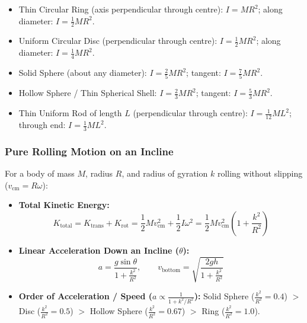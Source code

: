 \documentclass[11pt,a4paper]{article}
\begin{document}
\begin{formulabox}
\begin{itemize}[leftmargin=1.2em, itemsep=2pt]
  \item Thin Circular Ring (axis perpendicular through centre): $I = MR^2$; along diameter: $I = \frac{1}{2}MR^2$.
  \item Uniform Circular Disc (perpendicular through centre): $I = \frac{1}{2}MR^2$; along diameter: $I = \frac{1}{4}MR^2$.
  \item Solid Sphere (about any diameter): $I = \frac{2}{5}MR^2$; tangent: $I = \frac{7}{5}MR^2$.
  \item Hollow Sphere / Thin Spherical Shell: $I = \frac{2}{3}MR^2$; tangent: $I = \frac{5}{3}MR^2$.
  \item Thin Uniform Rod of length $L$ (perpendicular through centre): $I = \frac{1}{12}ML^2$; through end: $I = \frac{1}{3}ML^2$.
\end{itemize}
\end{formulabox}

\subsubsection{Pure Rolling Motion on an Incline}
For a body of mass $M$, radius $R$, and radius of gyration $k$ rolling without slipping ($v_{\text{cm}} = R\omega$):
\begin{itemize}[leftmargin=1.5em, itemsep=2pt]
  \item \textbf{Total Kinetic Energy:}
  \[
    K_{\text{total}} = K_{\text{trans}} + K_{\text{rot}} = \frac{1}{2} M v_{\text{cm}}^2 + \frac{1}{2} I \omega^2 = \frac{1}{2} M v_{\text{cm}}^2 \left(1 + \frac{k^2}{R^2}\right)
  \]
  \item \textbf{Linear Acceleration Down an Incline ($\theta$):}
  \[
    a = \frac{g \sin\theta}{1 + \frac{k^2}{R^2}}, \qquad v_{\text{bottom}} = \sqrt{\frac{2gh}{1 + \frac{k^2}{R^2}}}
  \]
  \item \textbf{Order of Acceleration / Speed ($a \propto \frac{1}{1 + k^2/R^2}$):}
  Solid Sphere ($\frac{k^2}{R^2} = 0.4$) $>$ Disc ($\frac{k^2}{R^2} = 0.5$) $>$ Hollow Sphere ($\frac{k^2}{R^2} = 0.67$) $>$ Ring ($\frac{k^2}{R^2} = 1.0$).
\end{itemize}

\vspace{10pt}

\end{document}
